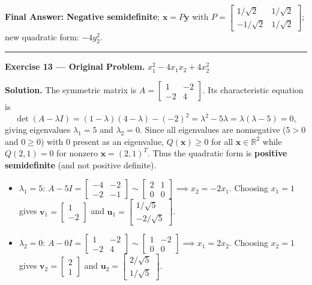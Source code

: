 \documentclass[11pt, letterpaper]{article}
\theoremstyle{definition}
\theoremstyle{remark}
\newcommand{\R}{\mathbb{R}}
\begin{document}
\textbf{Final Answer:} \textbf{Negative semidefinite}; $\mathbf{x} = P\mathbf{y}$ with $P = \begin{bmatrix} 1/\sqrt{2} & 1/\sqrt{2} \\ -1/\sqrt{2} & 1/\sqrt{2} \end{bmatrix}$; new quadratic form: $-4y_2^2$.

\medskip
\hrule
\medskip

\textbf{Exercise 13 --- Original Problem.} $x_1^2 - 4x_1x_2 + 4x_2^2$

\textbf{Solution.}
The symmetric matrix is $A = \begin{bmatrix} 1 & -2 \\ -2 & 4 \end{bmatrix}$. Its characteristic equation is
\[
\det(A - \lambda I) = (1 - \lambda)(4 - \lambda) - (-2)^2 = \lambda^2 - 5\lambda = \lambda(\lambda - 5) = 0,
\]
giving eigenvalues $\lambda_1 = 5$ and $\lambda_2 = 0$. Since all eigenvalues are nonnegative ($5 > 0$ and $0 \ge 0$) with $0$ present as an eigenvalue, $Q(\mathbf{x}) \ge 0$ for all $\mathbf{x} \in \R^2$ while $Q(2, 1) = 0$ for nonzero $\mathbf{x} = (2, 1)^T$. Thus the quadratic form is \textbf{positive semidefinite} (and not positive definite).
\begin{itemize}
    \item $\lambda_1 = 5$: $A - 5I = \begin{bmatrix} -4 & -2 \\ -2 & -1 \end{bmatrix} \sim \begin{bmatrix} 2 & 1 \\ 0 & 0 \end{bmatrix} \implies x_2 = -2x_1$. Choosing $x_1 = 1$ gives $\mathbf{v}_1 = \begin{bmatrix} 1 \\ -2 \end{bmatrix}$ and $\mathbf{u}_1 = \begin{bmatrix} 1/\sqrt{5} \\ -2/\sqrt{5} \end{bmatrix}$.
    \item $\lambda_2 = 0$: $A - 0I = \begin{bmatrix} 1 & -2 \\ -2 & 4 \end{bmatrix} \sim \begin{bmatrix} 1 & -2 \\ 0 & 0 \end{bmatrix} \implies x_1 = 2x_2$. Choosing $x_2 = 1$ gives $\mathbf{v}_2 = \begin{bmatrix} 2 \\ 1 \end{bmatrix}$ and $\mathbf{u}_2 = \begin{bmatrix} 2/\sqrt{5} \\ 1/\sqrt{5} \end{bmatrix}$.
\end{itemize}
\end{document}
